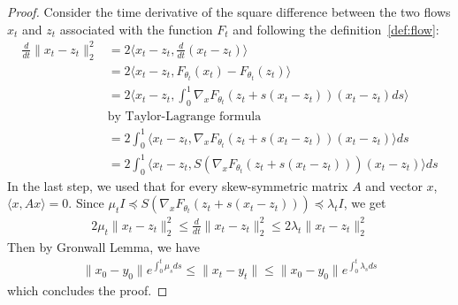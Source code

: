 \begin{proof}
  Consider the time derivative of the square difference between the two flows $x_t$ and $z_t$ associated with the function $F_t$ and following the definition~\ref{def:flow}: 
  \begin{align*}
    \frac{d}{dt} \lVert x_t-z_t\rVert_2^2 & = 2 \big\langle x_t-z_t,\frac{d}{dt}( x_t-z_t)\big\rangle\\
      &=2 \big\langle x_t-z_t,F_{\theta_{t}}(x_{t})-F_{\theta_{t}}(z_{t})\big\rangle \\
      &=  2 \big\langle x_t-z_t,\int_0^1\nabla_xF_{\theta_{t}}(z_{t}+s(x_t-z_t))(x_t-z_t)ds\big\rangle\\
      &\textrm{by Taylor-Lagrange formula}\\ 
      &=  2 \int_0^1\big\langle x_t-z_t,\nabla_xF_{\theta_{t}}(z_{t}+s(x_t-z_t))(x_t-z_t)\big\rangle ds\\
       &=  2 \int_0^1\big\langle x_t-z_t,S(\nabla_xF_{\theta_{t}}(z_{t}+s(x_t-z_t)))(x_t-z_t)\big\rangle ds
  \end{align*}
  In the last step, we used that for every skew-symmetric matrix $A$ and vector $x$, $\langle x,Ax\rangle = 0$.
  Since $\mu_tI\preceq S(\nabla_xF_{\theta_{t}}(z_{t}+s(x_t-z_t)))\preceq  \lambda_tI$, we get
  \begin{align*}
   2\mu_t \lVert x_t-z_t\rVert_2^2 \leq \frac{d}{dt} \lVert x_t-z_t\rVert_2^2 \leq 2\lambda_t \lVert x_t-z_t\rVert_2^2
  \end{align*}
  Then by Gronwall Lemma, we have
  \begin{align*}
    \lVert x_0-y_0 \rVert e^{\int_0^t\mu_s ds}\leq \lVert x_t-y_t \rVert\leq \lVert x_0-y_0 \rVert e^{ \int_0^t\lambda_s ds}
  \end{align*}
  which concludes the proof.
  \end{proof}

